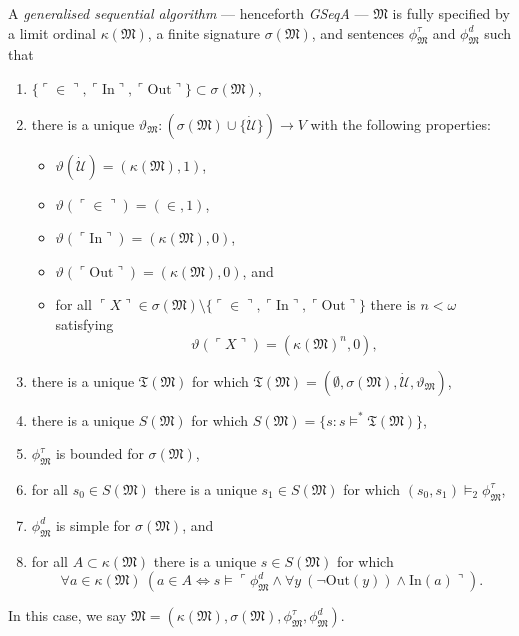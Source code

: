\documentclass[12pt]{article}
\numberwithin{equation}{section}
\begin{document}
\begin{defi}\label{def224}
A \emph{generalised sequential algorithm} --- henceforth \textit{GSeqA} --- $\mathfrak{M}$ is fully specified by a limit ordinal $\kappa(\mathfrak{M})$, a finite signature $\sigma(\mathfrak{M})$, and sentences $\phi^{\tau}_{\mathfrak{M}}$ and $\phi^d_{\mathfrak{M}}$ such that
\begin{enumerate}[label=(D\arabic*)]
    \item $\{\ulcorner \in \urcorner, \ulcorner \mathrm{In} \urcorner, \ulcorner \mathrm{Out} \urcorner\} \subset \sigma(\mathfrak{M})$,
    \item there is a unique $\vartheta_{\mathfrak{M}} : (\sigma(\mathfrak{M}) \cup \{\dot{\mathcal{U}}\}) \longrightarrow V$ with the following properties:
    \begin{itemize}
        \item $\vartheta(\dot{\mathcal{U}}) = (\kappa(\mathfrak{M}), 1)$,
        \item $\vartheta(\ulcorner \in \urcorner) = (\in, 1)$,
        \item $\vartheta(\ulcorner \mathrm{In} \urcorner) = (\kappa(\mathfrak{M}), 0)$,
        \item $\vartheta(\ulcorner \mathrm{Out} \urcorner) = (\kappa(\mathfrak{M}), 0)$, and
        \item for all $\ulcorner X \urcorner \in \sigma(\mathfrak{M}) \setminus \{\ulcorner \in \urcorner, \ulcorner \mathrm{In} \urcorner, \ulcorner \mathrm{Out} \urcorner\}$ there is $n < \omega$ satisfying 
        \begin{equation*}
            \vartheta(\ulcorner X \urcorner) = (\kappa(\mathfrak{M})^n, 0) \text{,}
        \end{equation*}
    \end{itemize}
    \item there is a unique $\mathfrak{T}(\mathfrak{M})$ for which $\mathfrak{T}(\mathfrak{M}) = (\emptyset, \sigma(\mathfrak{M}), \dot{\mathcal{U}}, \vartheta_{\mathfrak{M}})$,
    \item there is a unique $S(\mathfrak{M})$ for which $S(\mathfrak{M}) = \{s : s \models^* \mathfrak{T}(\mathfrak{M})\}$,
    \item $\phi^{\tau}_{\mathfrak{M}}$ is bounded for $\sigma(\mathfrak{M})$, 
    \item for all $s_0 \in S(\mathfrak{M})$ there is a unique $s_1 \in S(\mathfrak{M})$ for which $(s_0, s_1) \models_2 \phi^{\tau}_{\mathfrak{M}}$,
    \item $\phi^d_{\mathfrak{M}}$ is simple for $\sigma(\mathfrak{M})$, and
    \item for all $A \subset \kappa(\mathfrak{M})$ there is a unique $s \in S(\mathfrak{M})$ for which
    \begin{equation*}
        \forall a \in \kappa(\mathfrak{M}) \ (a \in A \iff s \models \ulcorner \phi^d_{\mathfrak{M}} \wedge \forall y \ (\neg \mathrm{Out}(y)) \wedge \mathrm{In}(a) \urcorner) \text{.}
    \end{equation*}
\end{enumerate}
In this case, we say $\mathfrak{M} = (\kappa(\mathfrak{M}), \sigma(\mathfrak{M}), \phi^{\tau}_{\mathfrak{M}}, \phi^d_{\mathfrak{M}})$.
\end{defi}
\end{document}
